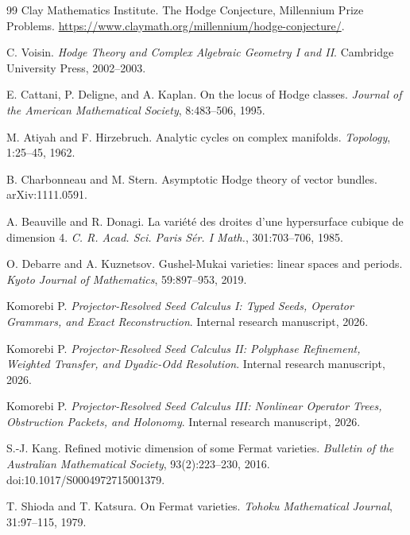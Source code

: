 \documentclass[11pt,oneside]{book}
\theoremstyle{definition}
\theoremstyle{remark}
\begin{document}
{\small
\begin{thebibliography}{99}
\setlength{\itemsep}{0.18em}
Clay Mathematics Institute.
\newblock The Hodge Conjecture, Millennium Prize Problems.
\newblock \url{https://www.claymath.org/millennium/hodge-conjecture/}.

C. Voisin.
\newblock \emph{Hodge Theory and Complex Algebraic Geometry I and II}.
\newblock Cambridge University Press, 2002--2003.

E. Cattani, P. Deligne, and A. Kaplan.
\newblock On the locus of Hodge classes.
\newblock \emph{Journal of the American Mathematical Society}, 8:483--506, 1995.

M. Atiyah and F. Hirzebruch.
\newblock Analytic cycles on complex manifolds.
\newblock \emph{Topology}, 1:25--45, 1962.

B. Charbonneau and M. Stern.
\newblock Asymptotic Hodge theory of vector bundles.
\newblock arXiv:1111.0591.

A. Beauville and R. Donagi.
\newblock La vari\'et\'e des droites d'une hypersurface cubique de dimension 4.
\newblock \emph{C. R. Acad. Sci. Paris S\'er. I Math.}, 301:703--706, 1985.

O. Debarre and A. Kuznetsov.
\newblock Gushel-Mukai varieties: linear spaces and periods.
\newblock \emph{Kyoto Journal of Mathematics}, 59:897--953, 2019.

Komorebi P.
\newblock \emph{Projector-Resolved Seed Calculus I: Typed Seeds, Operator Grammars, and Exact Reconstruction}.
\newblock Internal research manuscript, 2026.

Komorebi P.
\newblock \emph{Projector-Resolved Seed Calculus II: Polyphase Refinement, Weighted Transfer, and Dyadic-Odd Resolution}.
\newblock Internal research manuscript, 2026.

Komorebi P.
\newblock \emph{Projector-Resolved Seed Calculus III: Nonlinear Operator Trees, Obstruction Packets, and Holonomy}.
\newblock Internal research manuscript, 2026.

S.-J. Kang.
\newblock Refined motivic dimension of some Fermat varieties.
\newblock \emph{Bulletin of the Australian Mathematical Society}, 93(2):223--230, 2016.
\newblock doi:10.1017/S0004972715001379.

T. Shioda and T. Katsura.
\newblock On Fermat varieties.
\newblock \emph{Tohoku Mathematical Journal}, 31:97--115, 1979.


\end{thebibliography}}
\end{document}
